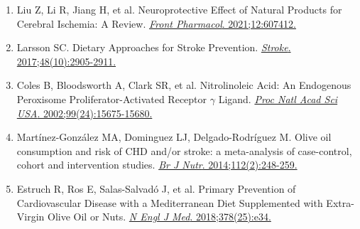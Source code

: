 \documentclass[12pt,a4paper]{article}
\begin{document}
\begin{enumerate}
    \item Liu Z, Li R, Jiang H, et al. Neuroprotective Effect of Natural Products for Cerebral Ischemia: A Review. \href{https://doi.org/10.3389/fphar.2021.607412}{\textit{Front Pharmacol}. 2021;12:607412.}

    \item Larsson SC. Dietary Approaches for Stroke Prevention. \href{https://doi.org/10.1161/STROKEAHA.117.017383}{\textit{Stroke}. 2017;48(10):2905-2911.}

    \item Coles B, Bloodsworth A, Clark SR, et al. Nitrolinoleic Acid: An Endogenous Peroxisome Proliferator-Activated Receptor $\gamma$ Ligand. \href{https://doi.org/10.1073/pnas.162238599}{\textit{Proc Natl Acad Sci USA}. 2002;99(24):15675-15680.}

    \item Martínez-González MA, Dominguez LJ, Delgado-Rodríguez M. Olive oil consumption and risk of CHD and/or stroke: a meta-analysis of case-control, cohort and intervention studies. \href{https://doi.org/10.1017/S0007114514000713}{\textit{Br J Nutr}. 2014;112(2):248-259.}

    \item Estruch R, Ros E, Salas-Salvadó J, et al. Primary Prevention of Cardiovascular Disease with a Mediterranean Diet Supplemented with Extra-Virgin Olive Oil or Nuts. \href{https://doi.org/10.1056/NEJMoa1800389}{\textit{N Engl J Med}. 2018;378(25):e34.}
\end{enumerate}
\end{document}
